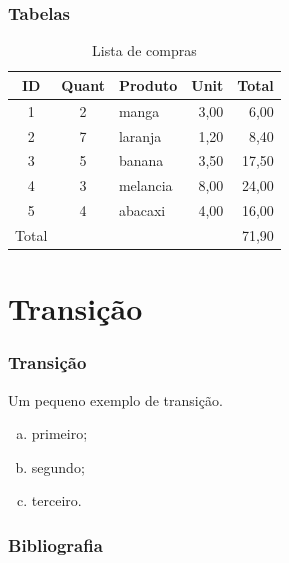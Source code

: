 \documentclass[aspectratio=169]{beamer}
\theoremstyle{Definition}
\begin{document}

%     

\begin{frame}\frametitle{Tabelas}
  \begin{table}
    \centering
    \begin{tabular}{cclrr}
      \toprule
      ID & Quant & Produto & Unit & Total\\
      \midrule
      1 & 2 & manga     & 3,00 & 6,00\\
      2 & 7 & laranja   & 1,20 & 8,40\\
      3 & 5 & banana    & 3,50 & 17,50\\
      4 & 3 & melancia  & 8,00 & 24,00\\
      5 & 4 & abacaxi   & 4,00 & 16,00\\
      \midrule
       Total &   &           &  & 71,90\\
      \bottomrule
    \end{tabular}
    \caption{Lista de compras}
  \end{table}
\end{frame}


\section{Transi\c c\~ao}

\begin{frame}\frametitle{Transi\c c\~ao}
Um pequeno exemplo de transi\c c\~ao.

\pause

\begin{enumerate}[a)]
  \item<2-> primeiro;
  \item<3-> segundo;
  \item<4-> terceiro.
\end{enumerate}
\end{frame}

\begin{frame}\frametitle{Bibliografia}
  
  
\end{frame}

\end{document}
